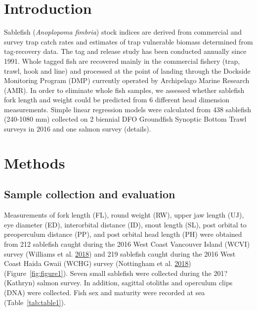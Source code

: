 \documentclass[12pt]{article}\usepackage[]{graphicx}\usepackage[]{color}
\begin{document}

\frontmatter


\renewcommand{\headrulewidth}{0.5pt}  %
\renewcommand{\footrulewidth}{0.5pt}  %

\hypertarget{introduction}{%
\section{Introduction}\label{introduction}}

Sablefish (\emph{Anoplopoma fimbria}) stock indices are derived from commercial and survey trap catch rates and estimates of trap vulnerable biomass determined from tag-recovery data. The tag and release study has been conducted annually since 1991. Whole tagged fish are recovered mainly in the commercial fishery (trap, trawl, hook and line) and processed at the point of landing through the Dockside Monitoring Program (DMP) currently operated by Archipelago Marine Research (AMR). In order to eliminate whole fish samples, we assessed whether sablefish fork length and weight could be predicted from 6 different head dimension measurements. Simple linear regression models were calculated from 438 sablefish (240-1080 mm) collected on 2 biennial DFO Groundfish Synoptic Bottom Trawl surveys in 2016 and one salmon survey (details).

\hypertarget{methods}{%
\section{Methods}\label{methods}}

\hypertarget{sample-collection-and-evaluation}{%
\subsection{Sample collection and evaluation}\label{sample-collection-and-evaluation}}

Measurements of fork length (FL), round weight (RW), upper jaw length (UJ), eye diameter (ED), interorbital distance (ID), snout length (SL), post orbital to preoperculum distance (PP), and post orbital head length (PH) were obtained from 212 sablefish caught during the 2016 West Coast Vancouver Island (WCVI) survey (Williams et al. \protect\hyperlink{ref-Williams2018}{2018}) and 219 sablefish caught during the 2016 West Coast Haida Gwaii (WCHG) survey (Nottingham et al. \protect\hyperlink{ref-Nottingham2018}{2018}) (Figure~\ref{fig:figure1}). Seven small sablefish were collected during the 201? (Kathryn) salmon survey. In addition, sagittal otoliths and operculum clips (DNA) were collected. Fish sex and maturity were recorded at sea (Table~\ref{tab:table1}).
\end{document}
